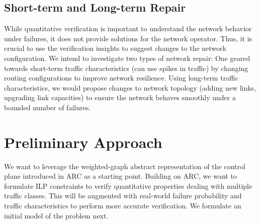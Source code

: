\documentclass[]{article}
\begin{document}
\subsection{Short-term and Long-term Repair}
While quantitative verification is important to understand the network behavior under failures, it does not provide solutions for the network operator. Thus, it is crucial to use the verification insights to suggest changes to the network configuration. We intend to investigate two types of network repair: One geared towards short-term traffic characteristics (can use spikes in traffic) by changing routing configurations to improve network resilience.  Using long-term traffic characteristics, we would propose changes to network topology (adding new links, upgrading link capacities) to ensure the network behaves smoothly under a bounded number of failures.

\section{Preliminary Approach}
We want to leverage the weighted-graph abstract representation of the control plane introduced in ARC as a starting point. Building on ARC, we want to formulate ILP constraints to verify quantitative properties dealing with multiple traffic classes. This will be augmented with real-world failure probability and traffic characteristics to perform more accurate verification. We formulate an initial model of the problem next.
\end{document}
